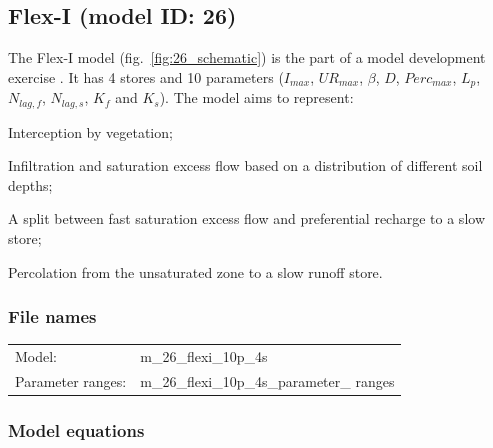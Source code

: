\subsection{Flex-I (model ID: 26)}
The Flex-I model (fig.~\ref{fig:26_schematic}) is the part of a model development exercise \citep{Fenicia2008}. It has 4 stores and 10 parameters ($I_{max}$, $UR_{max}$, $\beta$, $D$, $Perc_{max}$, $L_p$, $N_{lag,f}$, $N_{lag,s}$, $K_f$ and $K_s$). The model aims to represent:

\begin{itemizecompact}
\item Interception by vegetation;
\item Infiltration and saturation excess flow based on a distribution of different soil depths;
\item A split between fast saturation excess flow and preferential recharge to a slow store;
\item Percolation from the unsaturated zone to a slow runoff store.
\end{itemizecompact}

\subsubsection{File names}
\begin{tabular}{@{}ll}
Model: &m\_26\_flexi\_10p\_4s \\
Parameter ranges: &m\_26\_flexi\_10p\_4s\_parameter\_ ranges \\
\end{tabular}

\subsubsection{Model equations}

